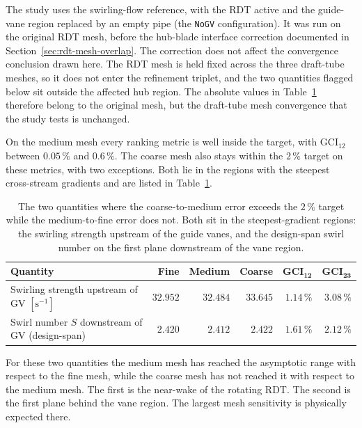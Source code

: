 The study uses the swirling-flow reference, with the RDT active and the guide-vane region replaced by an empty pipe (the \texttt{NoGV} configuration). It was run on the original RDT mesh, before the hub-blade interface correction documented in Section~\ref{sec:rdt-mesh-overlap}. The correction does not affect the convergence conclusion drawn here. The RDT mesh is held fixed across the three draft-tube meshes, so it does not enter the refinement triplet, and the two quantities flagged below sit outside the affected hub region. The absolute values in Table~\ref{tab:gci_swirl_keep} therefore belong to the original mesh, but the draft-tube mesh convergence that the study tests is unchanged.

On the medium mesh every ranking metric is well inside the target, with $\mathrm{GCI}_{12}$ between $0.05\,\%$ and $0.6\,\%$. The coarse mesh also stays within the $2\,\%$ target on these metrics, with two exceptions. Both lie in the regions with the steepest cross-stream gradients and are listed in Table~\ref{tab:gci_swirl_keep}.

\begin{table}[h!]
  \centering
  \caption[GCI: swirl-dependent quantities]{The two quantities where the coarse-to-medium error exceeds the $2\,\%$ target while the medium-to-fine error does not. Both sit in the steepest-gradient regions: the swirling strength upstream of the guide vanes, and the design-span swirl number on the first plane downstream of the vane region.}
  \label{tab:gci_swirl_keep}
  \small
  \begin{tabular}{l r r r r r}
    \toprule
    \textbf{Quantity} & \textbf{Fine} & \textbf{Medium} & \textbf{Coarse} & $\mathbf{GCI_{12}}$ & $\mathbf{GCI_{23}}$ \\
    \midrule
    Swirling strength upstream of GV $[\mathrm{s}^{-1}]$ & $32.952$ & $32.484$ & $33.645$ & $1.14\,\%$ & $\mathbf{3.08\,\%}$ \\
    Swirl number $S$ downstream of GV (design-span)      & $2.420$  & $2.412$  & $2.422$  & $1.61\,\%$ & $\mathbf{2.12\,\%}$ \\
    \bottomrule
  \end{tabular}
\end{table}

For these two quantities the medium mesh has reached the asymptotic range with respect to the fine mesh, while the coarse mesh has not reached it with respect to the medium mesh. The first is the near-wake of the rotating RDT. The second is the first plane behind the vane region. The largest mesh sensitivity is physically expected there.

